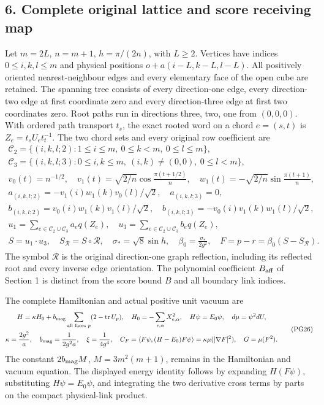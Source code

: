 \documentclass[11pt]{article}
\begin{document}
\subsection*{6. Complete original lattice and score receiving map}

Let \(m=2L\), \(n=m+1\), \(h=\pi/(2n)\), with \(L\ge2\).
Vertices have indices \(0\le i,k,l\le m\) and physical positions
\(o+a(i-L,k-L,l-L)\). All positively oriented nearest-neighbour
edges and every elementary face of the open cube are retained.
The spanning tree consists of every direction-one edge, every
direction-two edge at first coordinate zero and every direction-three
edge at first two coordinates zero. Root paths run in directions
three, two, one from \((0,0,0)\). With ordered path transport \(t_s\),
the exact rooted word on a chord \(e=(s,t)\) is \(Z_e=t_sU_et_t^{-1}\).
The two chord sets and every original row coefficient are
\[
 \begin{gathered}
 \mathcal C_2=\{(i,k,l;2):1\le i\le m,\ 0\le k<m,\ 0\le l\le m\},\\
 \mathcal C_3=\{(i,k,l;3):0\le i,k\le m,\ (i,k)\ne(0,0),\
                                      0\le l<m\},\\
 v_0(t)=n^{-1/2},\quad
 v_1(t)=\sqrt{2/n}\cos\frac{\pi(t+1/2)}n,\quad
 w_1(t)=-\sqrt{2/n}\sin\frac{\pi(t+1)}n,\\
 a_{(i,k,l;2)}=-v_1(i)w_1(k)v_0(l)/\sqrt2,\quad
 a_{(i,k,l;3)}=0,\\
 b_{(i,k,l;2)}=v_0(i)w_1(k)v_1(l)/\sqrt2,\quad
 b_{(i,k,l;3)}=-v_0(i)v_1(k)w_1(l)/\sqrt2,\\
 u_1=\sum_{e\in\mathcal C_2\cup\mathcal C_3}a_eq(Z_e),\quad
 u_3=\sum_{e\in\mathcal C_2\cup\mathcal C_3}b_eq(Z_e),\\
 S=u_1\cdot u_3,\quad S_{\mathcal R}=S\circ\mathcal R,\quad
 \sigma_*=\sqrt8\sin h,\quad\beta_0=\frac{\sigma_*}{2g^2},\quad
 F=p-r=\beta_0(S-S_{\mathcal R}).
 \end{gathered}\tag{PG25}
\]
The symbol \(\mathcal R\) is the original direction-one graph
reflection, including its reflected root and every inverse edge
orientation. The polynomial coefficient \(B_{\rm aff}\) of Section 1 is
distinct from the score bound \(B\) and all boundary link indices.

The complete Hamiltonian and actual positive unit vacuum are
\[
 \begin{gathered}
 H=\kappa H_0+b_{\rm mag}\sum_{\text{all faces }p}
                       (2-\operatorname{tr}U_p),\quad
 H_0=-\sum_{e,\alpha}X_{e,\alpha}^2,\quad H\psi=E_0\psi,\quad
 d\mu=\psi^2dU,\\
 \kappa=\frac{2g^2}{a},\quad b_{\rm mag}=\frac1{2g^2a},\quad
 \xi=\frac1{4g^4},\quad
 C_F=\langle F\psi,(H-E_0)F\psi\rangle
                      =\kappa\mu(|\nabla F|^2),\quad G=\mu(F^2).
 \end{gathered}\tag{PG26}
\]
The constant \(2b_{\rm mag}M\), \(M=3m^2(m+1)\), remains in the
Hamiltonian and vacuum equation. The displayed energy identity follows
by expanding \(H(F\psi)\), substituting \(H\psi=E_0\psi\), and
integrating the two derivative cross terms by parts on the compact
physical-link product.
\end{document}
